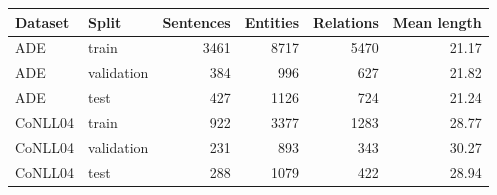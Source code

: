 \begin{tabular}{llrrrr}
\toprule
Dataset & Split & Sentences & Entities & Relations & Mean length \\
\midrule
ADE & train & 3461 & 8717 & 5470 & 21.17 \\
ADE & validation & 384 & 996 & 627 & 21.82 \\
ADE & test & 427 & 1126 & 724 & 21.24 \\
CoNLL04 & train & 922 & 3377 & 1283 & 28.77 \\
CoNLL04 & validation & 231 & 893 & 343 & 30.27 \\
CoNLL04 & test & 288 & 1079 & 422 & 28.94 \\
\bottomrule
\end{tabular}
